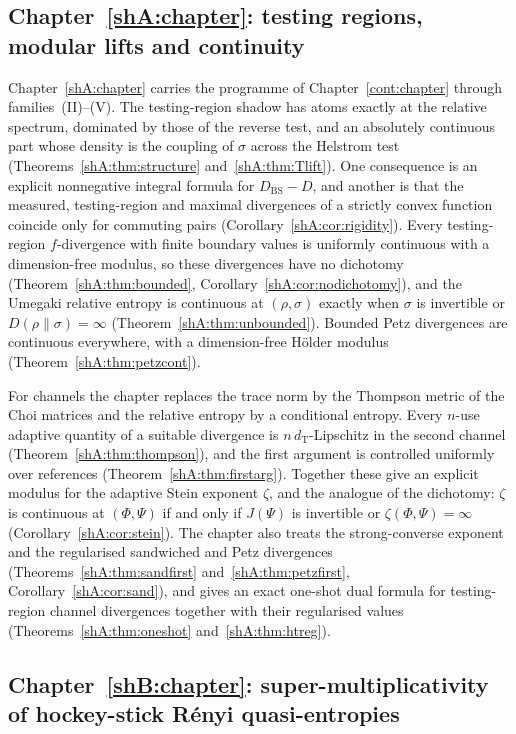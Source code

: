 \subsection*{Chapter~\ref{shA:chapter}: testing regions, modular lifts and continuity}

Chapter~\ref{shA:chapter} carries the programme of Chapter~\ref{cont:chapter} through families~(II)--(V). The testing-region shadow has atoms exactly at the relative spectrum, dominated by those of the reverse test, and an absolutely continuous part whose density is the coupling of $\sigma$ across the Helstrom test (Theorems~\ref{shA:thm:structure} and~\ref{shA:thm:Tlift}). One consequence is an explicit nonnegative integral formula for $D_{\mathrm{BS}}-D$, and another is that the measured, testing-region and maximal divergences of a strictly convex function coincide only for commuting pairs (Corollary~\ref{shA:cor:rigidity}). Every testing-region $f$-divergence with finite boundary values is uniformly continuous with a dimension-free modulus, so these divergences have no dichotomy (Theorem~\ref{shA:thm:bounded}, Corollary~\ref{shA:cor:nodichotomy}), and the Umegaki relative entropy is continuous at $(\rho,\sigma)$ exactly when $\sigma$ is invertible or $D(\rho\|\sigma)=\infty$ (Theorem~\ref{shA:thm:unbounded}). Bounded Petz divergences are continuous everywhere, with a dimension-free H\"older modulus (Theorem~\ref{shA:thm:petzcont}).

For channels the chapter replaces the trace norm by the Thompson metric of the Choi matrices and the relative entropy by a conditional entropy. Every $n$-use adaptive quantity of a suitable divergence is $n\,d_{\mathrm T}$-Lipschitz in the second channel (Theorem~\ref{shA:thm:thompson}), and the first argument is controlled uniformly over references (Theorem~\ref{shA:thm:firstarg}). Together these give an explicit modulus for the adaptive Stein exponent $\zeta$, and the analogue of the dichotomy: $\zeta$ is continuous at $(\Phi,\Psi)$ if and only if $J(\Psi)$ is invertible or $\zeta(\Phi,\Psi)=\infty$ (Corollary~\ref{shA:cor:stein}). The chapter also treats the strong-converse exponent and the regularised sandwiched and Petz divergences (Theorems~\ref{shA:thm:sandfirst} and~\ref{shA:thm:petzfirst}, Corollary~\ref{shA:cor:sand}), and gives an exact one-shot dual formula for testing-region channel divergences together with their regularised values (Theorems~\ref{shA:thm:oneshot} and~\ref{shA:thm:htreg}).

\subsection*{Chapter~\ref{shB:chapter}: super-multiplicativity of hockey-stick R\'enyi quasi-entropies}

